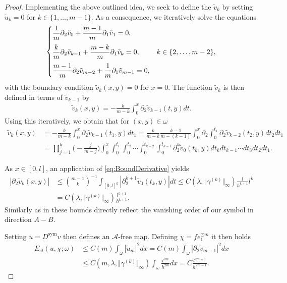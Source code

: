 \documentclass[a4paper, 10pt, twoside, notitlepage]{amsart}
\theoremstyle{plain}
\newcommand{\p}{\partial}
\newcommand{\A}{\mathcal{A}}
\newcommand{\Ds}{D^{\text{sym}}}
\begin{document}
\begin{proof}
			Implementing the above outlined idea, we seek to define the $\tilde{v}_k$ by setting $\tilde{u}_k = 0$ for $k \in \{1,\dots,m-1\}$. As a consequence, we iteratively solve the equations
			$$
			\begin{cases}
				\displaystyle\vspace{1.5ex}
				\frac{1}{m} \p_2 \tilde{v}_0 + \frac{m-1}{m} \p_1 \tilde{v}_1 = 0, \\
				\displaystyle\vspace{1.5ex}
				\frac{k}{m} \p_2 \tilde{v}_{k-1} + \frac{m-k}{m} \p_1 \tilde{v}_k = 0, & k \in \{2,\dots,m-2\}, \\
				\displaystyle
				\frac{m-1}{m} \p_2 \tilde{v}_{m-2} + \frac{1}{m} \p_1 \tilde{v}_{m-1} = 0,
			\end{cases}
			$$
			with the boundary condition $\tilde{v}_k(x,y) = 0$ for $x =0 $.  The function $\tilde{v}_k$ is then defined in terms of $\tilde{v}_{k-1}$ by
			\begin{align*}
				\tilde{v}_k(x,y) = - \frac{k}{m-k} \int_{0}^x \p_2 \tilde{v}_{k-1}(t,y) dt.
			\end{align*}
			Using this iteratively, we obtain that for $(x,y) \in \omega$
			\begin{align*}
				\tilde{v}_k(x,y) & = - \frac{k}{m-k} \int_{0}^x \p_2 \tilde{v}_{k-1}(t_1,y) dt_1 = \frac{k}{m-k} \frac{k-1}{m-(k-1)} \int_0^x \p_2 \int_0^{t_1} \p_2 \tilde{v}_{k-2}(t_2,y) dt_2 dt_1 \\
				& = \prod_{j=1}^k \Big( - \frac{j}{m-j} \Big) \int_0^x \int_0^{t_1} \int_0^{t_2} \cdots \int_0^{t_{k-2}} \int_0^{t_{k-1}} \p_2^k \tilde{v}_0(t_k,y) dt_k dt_{k-1} \cdots dt_3 dt_2 dt_1.
			\end{align*}
			
			As $x \in [0,l]$, an application of \eqref{eq:BoundDerivative} yields
			\begin{align*}
				|\p_2 \tilde{v}_k(x,y)| &\leq \binom{m-1}{k}^{-1} \int_{[0,l]^k} |\p_2^{k+1} \tilde{v}_0(t_k,y)| dt \leq C(\lambda,\Vert \gamma^{(k)} \Vert_\infty) \frac{l}{h^{k+1}} l^k \\
				&= C(\lambda,\Vert \gamma^{(k)} \Vert_\infty) \frac{l^{k+1}}{h^{k+1}}.
			\end{align*}
			Similarly as in \cite{CC15} these bounds directly reflect the vanishing order of our symbol in direction $A-B$.
			
			Setting $u = \Ds v$ then defines an $\A$-free map. Defining $\chi = f e_1^{\odot m}$ it then holds
			\begin{align*}
                          E_{el}(u,\chi;\omega) & \leq C(m) \int_\omega |\tilde{u}_{m}|^2 dx = C(m) \int_\omega |\p_2 \tilde{v}_{m-1}|^2 dx \\
                                                &\leq C(m,\lambda,\Vert \gamma^{(k)} \Vert_\infty) \int_{\omega} \frac{l^{2m}}{h^{2m}} dx = C \frac{l^{2m+1}}{h^{2m-1}}.
			\end{align*}
			

\end{proof}
\end{document}
